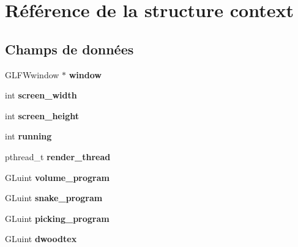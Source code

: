 \hypertarget{structcontext}{\section{Référence de la structure context}
\label{structcontext}
}
\subsection*{Champs de données}
\begin{DoxyCompactItemize}
\item 
\hypertarget{structcontext_a80de27bd7dc4e2b2ad3d5895b97a70f0}{G\-L\-F\-Wwindow $\ast$ {\bfseries window}}\label{structcontext_a80de27bd7dc4e2b2ad3d5895b97a70f0}

\item 
\hypertarget{structcontext_aa4d434a8b93410ea0ed660e48dac41c6}{int {\bfseries screen\-\_\-width}}\label{structcontext_aa4d434a8b93410ea0ed660e48dac41c6}

\item 
\hypertarget{structcontext_a3b4a1bd850991355b91c7bfc15247d49}{int {\bfseries screen\-\_\-height}}\label{structcontext_a3b4a1bd850991355b91c7bfc15247d49}

\item 
\hypertarget{structcontext_a2f45113638a0b749a8a205d2cd7fb42b}{int {\bfseries running}}\label{structcontext_a2f45113638a0b749a8a205d2cd7fb42b}

\item 
\hypertarget{structcontext_ac223398d564a4c19d0f8a50a4433489f}{pthread\-\_\-t {\bfseries render\-\_\-thread}}\label{structcontext_ac223398d564a4c19d0f8a50a4433489f}

\item 
\hypertarget{structcontext_a2c71df623af0b47c73c156d680534eea}{G\-Luint {\bfseries volume\-\_\-program}}\label{structcontext_a2c71df623af0b47c73c156d680534eea}

\item 
\hypertarget{structcontext_aa92054dddc3b6e428b54520b2ac939e2}{G\-Luint {\bfseries snake\-\_\-program}}\label{structcontext_aa92054dddc3b6e428b54520b2ac939e2}

\item 
\hypertarget{structcontext_a0fa1e2cf7849b9bc36ecd9d84ef588c5}{G\-Luint {\bfseries picking\-\_\-program}}\label{structcontext_a0fa1e2cf7849b9bc36ecd9d84ef588c5}

\item 
\hypertarget{structcontext_a58097335e8968dc6c85a1eb5d35269a0}{G\-Luint {\bfseries dwoodtex}}\label{structcontext_a58097335e8968dc6c85a1eb5d35269a0}


\end{DoxyCompactItemize}
